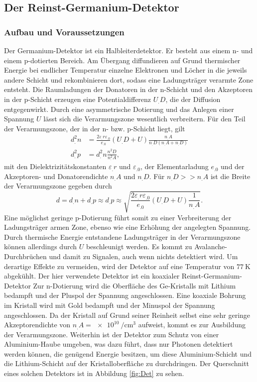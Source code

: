 \subsection{Der Reinst-Germanium-Detektor}

\subsubsection{Aufbau und Voraussetzungen}

Der Germanium-Detektor ist ein Halbleiterdetektor. Er besteht aus einem n- und einem p-dotierten Bereich. Am Übergang diffundieren auf Grund thermischer Energie bei endlicher Temperatur einzelne Elektronen und Löcher in die jeweils andere Schicht und rekombinieren dort, sodass eine Ladungsträger verarmte Zone entsteht. Die Raumladungen der Donatoren in der n-Schicht und den Akzeptoren in der p-Schicht erzeugen eine Potentialdifferenz $U_.D$, die der Diffusion entgegenwirkt.
Durch eine asymmetrische Dotierung und das Anlegen einer Spannung $U$ lässt sich die Verarmungszone wesentlich verbreitern.
Für den Teil der Verarmungszone, der in der n- bzw. p-Schicht liegt, gilt
\begin{align*}
d^2_.n&=\frac{2\varepsilon_.r\varepsilon_.0}{e_.0}\left(U_.D+U\right)\frac{n_.A}{n_.D\left(n_.A+n_.D\right)}\\
d^2_.p&=d^2_.n\frac{n^2_.D}{n^2_.A},
\end{align*}
mit den Dielektrizitätskonstanten $\varepsilon_.r$ und $\varepsilon_.0$, der Elementarladung $e_.0$ und der Akzeptoren- und Donatorendichte $n_.A$ und $n_.D$.
Für $n_.D>>n_.A$ ist die Breite der Verarmungszone gegeben durch
\begin{equation}
d=d_.n+d_.p\approx d_.p\approx\sqrt{\frac{2\varepsilon_.r\varepsilon_.0}{e_.0}\left(U_.D+U\right)\frac{1}{n_.A}}\text{.}
\end{equation}
Eine möglichst geringe p-Dotierung führt somit zu einer Verbreiterung der Ladungsträger armen Zone, ebenso wie eine Erhöhung der angelegten Spannung. Durch thermische Energie entstandene Ladungsträger in der Verarmungszone können allerdings durch $U$ beschleunigt werden. Es kommt zu Avalanche-Durchbrüchen und damit zu Signalen, auch wenn nichts detektiert wird.
Um derartige Effekte zu vermeiden, wird der Detektor auf eine Temperatur von $\SI{77}{\kelvin}$ abgekühlt.
Der hier verwendete Detektor ist ein koaxialer Reinst-Germanium-Detektor Zur n-Dotierung wird die Oberfläche des Ge-Kristalls mit Lithium bedampft und der Pluspol der Spannung angeschlossen.
Eine koaxiale Bohrung im Kristall wird mit Gold bedampft und der Minuspol der Spannung angeschlossen. Da der Kristall auf Grund seiner Reinheit selbst eine sehr geringe Akzeptorendichte von $n_.A=\SI{e10}{\per\cm^3}$ aufweist, kommt es zur Ausbildung der Verarmungszone. Weiterhin ist der Detektor zum Schutz von einer Aluminium-Haube umgeben, was dazu führt, dass nur Photonen detektiert werden können, die genügend Energie besitzen, um diese Aluminium-Schicht und die Lithium-Schicht auf der Kristalloberfläche zu durchdringen. Der Querschnitt eines solchen Detektors ist in Abbildung \ref{fig:Det} zu sehen.

